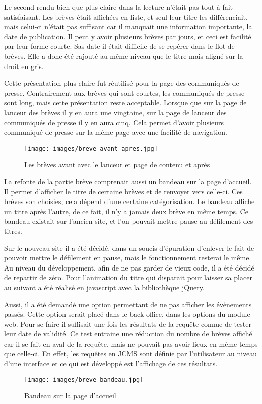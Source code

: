 \documentclass[12pt,a4paper]{article}
\begin{document}
\medskip
Le second rendu bien que plus claire dans la lecture n'était pas tout à fait satisfaisant. Les brèves était affichées en liste, et seul leur titre les différenciait, mais celui-ci n'était pas suffisant car il manquait une information importante, la date de publication. Il peut y avoir plusieurs brèves par jours, et ceci est facilité par leur forme courte. Sas date il était difficile de se repérer dans le flot de brèves. Elle a donc été rajouté au même niveau que le titre mais aligné sur la droit en gris.\par
\medskip
Cette présentation plus claire fut réutilisé pour la page des communiqués de presse. Contrairement aux brèves qui sont courtes, les communiqués de presse sont long, mais cette présentation reste acceptable. Lorsque que sur la page de lanceur des brèves il y en aura une vingtaine, sur la page de lanceur des communiqués de presse il y en aura cinq. Cela permet d'avoir plusieurs communiqué de presse sur la même page avec une facilité de navigation.\par
\begin{figure}[h!]
\centering\texttt{[image: images/breve\_avant\_apres.jpg]} 
\caption{Les brèves avant avec le lanceur et page de contenu et après}
\end{figure}
\bigskip 
La refonte de la partie brève comprenait aussi un bandeau sur la page d'accueil. Il permet d'afficher le titre de certaine brèves et de renvoyer vers celle-ci. Ces brèves son choisies, cela dépend d'une certaine catégorisation. Le bandeau affiche un titre après l'autre, de ce fait, il n'y a jamais deux brève en même temps. Ce bandeau existait sur l'ancien site, et l'on pouvait mettre pause au défilement des titres.\par 
Sur le nouveau site il a été décidé, dans un soucis d'épuration d'enlever le fait de pouvoir mettre le défilement en pause, mais le fonctionnement resterai le même. Au niveau du développement, afin de ne pas garder de vieux code, il a été décidé de repartir de zéro. Pour l'animation du titre qui disparait pour laisser sa placer au suivant a été réalisé en javascript avec la bibliothèque jQuery.\par 
Aussi, il a été demandé une option permettant de ne pas afficher les évènements passés. Cette option serait placé dans le back office, dans les options du module web. Pour se faire il suffisait une fois les résultats de la requête connue de tester leur date de validité. Ce test entraine une réduction du nombre de brèves affiché car il se fait en aval de la requête, mais ne pouvait pas avoir lieux en même temps que celle-ci. En effet, les requêtes en JCMS sont définie par l'utilisateur au niveau d'une interface et ce qui est développé est l'affichage de ces résultats.\par
\begin{figure}[h!]
\centering\texttt{[image: images/breve\_bandeau.jpg]} 
\caption{Bandeau sur la page d'accueil}
\end{figure}
\end{document}
